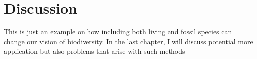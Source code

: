 \section{Discussion} %
This is just an example on how including both living and fossil species can change our vision of biodiversity.
In the last chapter, I will discuss potential more application but also problems that arise with such methods

%